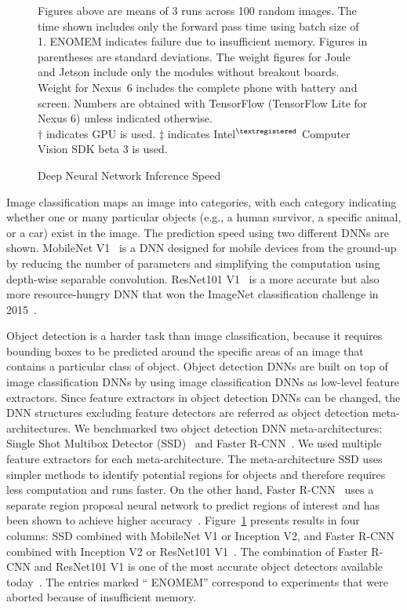 \begin{figure}
\begin{tabular}
\end{tabular}
\begin{captiontext}
\vspace{0.1in}
Figures above are means of 3 runs across 100 random images. The time shown
includes only the forward pass time using batch size of 1. ENOMEM indicates
failure due to insufficient memory. Figures in parentheses are standard
deviations. The weight figures for Joule and Jetson include only the modules
without breakout boards. Weight for Nexus~6 includes the complete phone with
battery and screen. Numbers are obtained with TensorFlow (TensorFlow Lite for
Nexus 6) unless indicated otherwise. \\
$\dagger$ indicates GPU is used. $\ddagger$ indicates
Intel$^{\tiny\textregistered}$ Computer Vision SDK beta 3 is used.
\end{captiontext}
\caption{Deep Neural Network Inference Speed}
\label{fig:onboard-dnn-speed}
\end{figure}

Image classification maps an image into categories, with each category
indicating whether one or many particular objects (e.g., a human survivor, a
specific animal, or a car) exist in the image.  The prediction speed using two
different DNNs are shown. MobileNet V1~\cite{Howard2017} is a DNN
designed for mobile devices from the ground-up by reducing the number of
parameters and simplifying the computation using
depth-wise separable convolution. ResNet101 V1~\cite{He2016} is a more accurate
but also more resource-hungry DNN that won the ImageNet
classification challenge in 2015~\cite{Russakovsky15}. 

Object detection is a harder task than image classification, because it requires
bounding boxes to be predicted around the specific areas of an image that
contains a particular class of object. Object detection DNNs are built on top of
image classification DNNs by using image classification DNNs as low-level
feature extractors. Since feature extractors in object detection DNNs can be
changed, the DNN structures excluding feature detectors are referred as object
detection meta-architectures. We benchmarked two object detection DNN
meta-architectures: Single Shot Multibox Detector (SSD)~\cite{Liu2016} and
Faster R-CNN~\cite{Ren2015}. We used multiple feature extractors for each
meta-architecture. The meta-architecture SSD uses simpler methods to identify
potential regions for objects and therefore requires less computation and runs
faster. On the other hand, Faster R-CNN~\cite{Ren2015} uses a separate region
proposal neural network to predict regions of interest and has been shown to
achieve higher accuracy~\cite{Huang2017}. Figure~\ref{fig:onboard-dnn-speed}
presents results in four columns: SSD combined with MobileNet V1 or Inception
V2, and Faster R-CNN combined with Inception V2 or ResNet101 V1~\cite{He2016}.
The combination of Faster R-CNN and ResNet101 V1 is one of the most accurate
object detectors available today~\cite{Russakovsky15}. The entries marked ``{\sc
ENOMEM}'' correspond to experiments that were aborted because of insufficient
memory.

